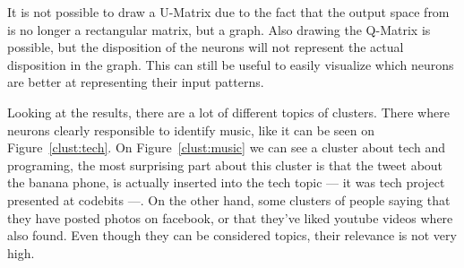 


It is not possible to draw a \ac{U-Matrix} due to the fact that the output space from is no longer a rectangular matrix, but a graph. Also drawing the \ac{Q-Matrix} is possible, but the disposition of the neurons will not represent the actual disposition in the graph. This can still be useful to easily visualize which neurons are better at representing their input patterns. 

Looking at the results, there are a lot of different topics of clusters. There where neurons clearly responsible to identify music, like it can be seen on Figure~\ref{clust:tech}. On Figure~\ref{clust:music} we can see a cluster about tech and programing, the most surprising part about this cluster is that the tweet about the banana phone, is actually inserted into the tech topic --- it was tech project presented at codebits ---. 
On the other hand, some clusters of people saying that they have posted photos on facebook, or that they've liked youtube videos where also found. Even though they can be considered topics, their relevance is not very high.

